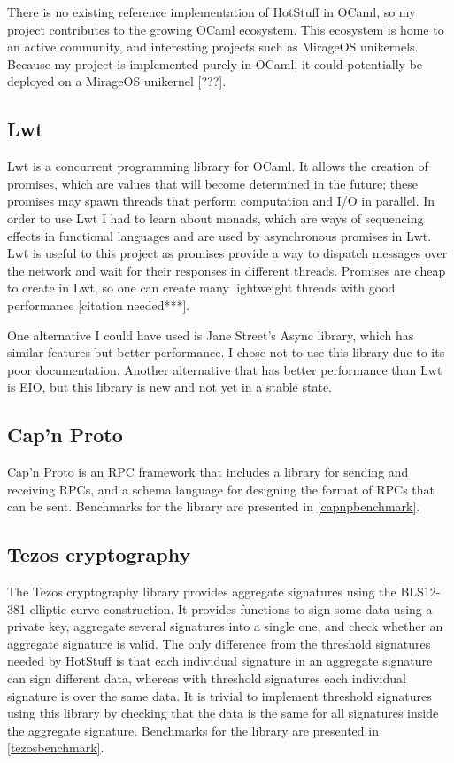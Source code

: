 There is no existing reference implementation of HotStuff in OCaml, so my project contributes to the growing OCaml ecosystem. This ecosystem is home to an active community, and interesting projects such as MirageOS unikernels. Because my project is implemented purely in OCaml, it could potentially be deployed on a MirageOS unikernel [???].

\subsection{Lwt}
Lwt is a concurrent programming library for OCaml. It allows the creation of promises, which are values that will become determined in the future; these promises may spawn threads that perform computation and I/O in parallel. In order to use Lwt I had to learn about monads, which are ways of sequencing effects in functional languages and are used by asynchronous promises in Lwt. Lwt is useful to this project as promises provide a way to dispatch messages over the network and wait for their responses in different threads. Promises are cheap to create in Lwt, so one can create many lightweight threads with good performance [citation needed***].

One alternative I could have used is Jane Street's Async library, which has similar features but better performance. I chose not to use this library due to its poor documentation. Another alternative that has better performance than Lwt is EIO, but this library is new and not yet in a stable state.

\subsection{Cap'n Proto}
Cap'n Proto is an RPC framework that includes a library for sending and receiving RPCs, and a schema language for designing the format of RPCs that can be sent. Benchmarks for the library are presented in \ref{capnpbenchmark}.

\subsection{Tezos cryptography} \label{tezos}
The Tezos cryptography library provides aggregate signatures using the BLS12-381 elliptic curve construction. It provides functions to sign some data using a private key, aggregate several signatures into a single one, and check whether an aggregate signature is valid. The only difference from the threshold signatures needed by HotStuff is that each individual signature in an aggregate signature can sign different data, whereas with threshold signatures each individual signature is over the same data. It is trivial to implement threshold signatures using this library by checking that the data is the same for all signatures inside the aggregate signature. Benchmarks for the library are presented in \ref{tezosbenchmark}.

